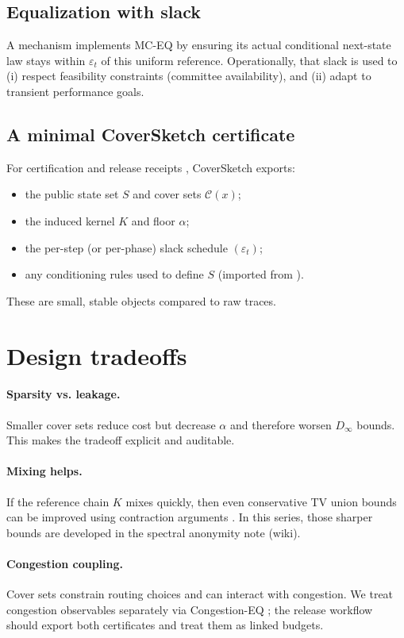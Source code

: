 \documentclass[11pt]{article}
\newcommand{\eps}{\varepsilon}
\begin{document}
\subsection{Equalization with slack}
A mechanism implements MC-EQ by ensuring its actual conditional next-state law stays within $\eps_t$ of this uniform reference.
Operationally, that slack is used to (i) respect feasibility constraints (committee availability), and (ii) adapt to transient performance goals.

\subsection{A minimal CoverSketch certificate}
For certification and release receipts \cite{series:release}, CoverSketch exports:
\begin{itemize}[leftmargin=1.2em]
\item the public state set $S$ and cover sets $\mathcal{C}(x)$;
\item the induced kernel $K$ and floor $\alpha$;
\item the per-step (or per-phase) slack schedule $(\eps_t)$;
\item any conditioning rules used to define $S$ (imported from \cite{series:state2}).
\end{itemize}
These are small, stable objects compared to raw traces.

\section{Design tradeoffs}
\paragraph{Sparsity vs. leakage.}
Smaller cover sets reduce cost but decrease $\alpha$ and therefore worsen $D_\infty$ bounds.
This makes the tradeoff explicit and auditable.

\paragraph{Mixing helps.}
If the reference chain $K$ mixes quickly, then even conservative TV union bounds can be improved using contraction arguments \cite{levin_peres_wilmer_mixing}.
In this series, those sharper bounds are developed in the spectral anonymity note (wiki).

\paragraph{Congestion coupling.}
Cover sets constrain routing choices and can interact with congestion.
We treat congestion observables separately via Congestion-EQ \cite{series:congeq}; the release workflow should export both certificates and treat them as linked budgets.
\end{document}
